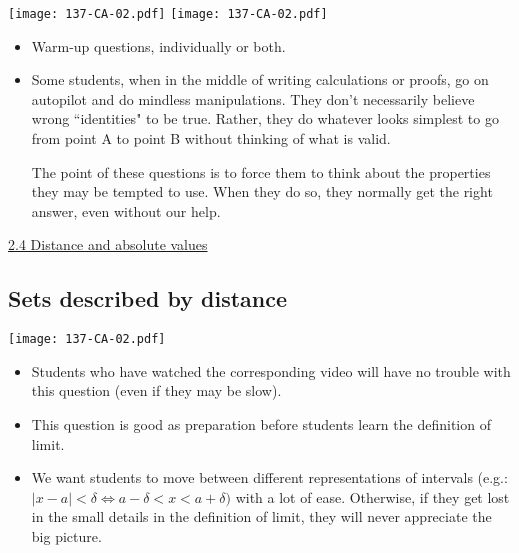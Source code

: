 \documentclass[11pt]{article}
\newcommand{\n}{\newpage}
\newcommand{\nl}{\hfill \vspace{-1.1\baselineskip}} %
\newcommand{\viv}{\hspace{8mm} \href{https://www.youtube.com/watch?v=6wFC38rVMbk&list=PLlwePzQY_wW8P_I8BFgm0-upywEwTKd8_&index=4}{2.4 Distance and absolute values}}
\begin{document}
\begin{center}
{ \texttt{[image: 137-CA-02.pdf]}} \quad
{ \texttt{[image: 137-CA-02.pdf]}}
\end{center}


\begin{comments}
\nl
	\begin{itemize}
		\item Warm-up questions, individually or both.
		\item Some students, when in the middle of writing calculations or proofs, go on autopilot and do mindless manipulations.  They don't necessarily believe wrong ``identities" to be true.  Rather, they do whatever looks simplest to go from point A to point B without thinking of what is valid.  
		
		The point of these questions is to force them to think about the properties they may be tempted to use.  When they do so, they normally get the right answer, even without our help.
	\end{itemize}
\end{comments}

\begin{videos}
\viv
\end{videos}

\n
\newpage
\subsection{Sets described by distance} 

\begin{center}
{ \texttt{[image: 137-CA-02.pdf]}}
\end{center}

\begin{comments}
\nl
	\begin{itemize}
		\item Students who have watched the corresponding video will have no trouble with this question (even if they may be slow).
		\item  This question is good as preparation before students learn the definition of limit.
		\item  We want students to move between different representations of intervals (e.g.: $|x-a|<\delta \iff a-\delta < x <a + \delta)$ with a lot of ease.  Otherwise, if they get lost in the small details in the definition of limit, they will never appreciate the big picture.
	\end{itemize}
\end{comments}
\end{document}
